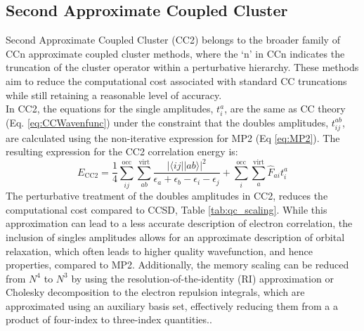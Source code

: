 \subsection{Second Approximate Coupled Cluster}\label{sec:CC2Theory}
Second Approximate Coupled Cluster (CC2)\cite{shavitt2009many} belongs to the broader family of CCn approximate coupled cluster methods, where the `n' in CCn indicates the truncation of the cluster operator within a perturbative hierarchy. These methods aim to reduce the computational cost associated with standard CC truncations while still retaining a reasonable level of accuracy.\\

In CC2, the equations for the single amplitudes, $t^a_i$, are the same as CC theory (Eq. \ref{eq:CCWavenfunc}) under the constraint that the doubles amplitudes, $t^{ab}_{ij}$, are calculated using the non-iterative expression for MP2 (Eq \ref{eq:MP2}). The resulting expression for the CC2 correlation energy is:
\begin{equation}\label{CC2Energy}
    E_{\mathrm{CC2}} = \frac{1}{4}\sum_{ij}^{\mathrm{occ}} \sum_{ab}^{\mathrm{virt}} \frac{|\langle i j || a b \rangle|^2}{\epsilon_a + \epsilon_b - \epsilon_i - \epsilon_j}  + \sum_{i}^{\mathrm{occ}} \sum_{a}^{\mathrm{virt}} \hat{F}_{ai} t^a_i 
\end{equation}
The perturbative treatment of the doubles amplitudes in CC2, reduces the computational cost compared to CCSD, Table \ref{tab:qc_scaling}. While this approximation can lead to a less accurate description of electron correlation, the inclusion of singles amplitudes allows for an approximate description of orbital relaxation, which often leads to higher quality wavefunction, and hence properties, compared to MP2.
Additionally, the memory scaling can be reduced from $N^4$ to $N^3$ by using the resolution-of-the-identity (RI) approximation or Cholesky decomposition to the electron repulsion integrals, which are approximated using an auxiliary basis set, effectively reducing them from a a product of four-index to three-index quantities.\cite{hattig2000cc2,}.

